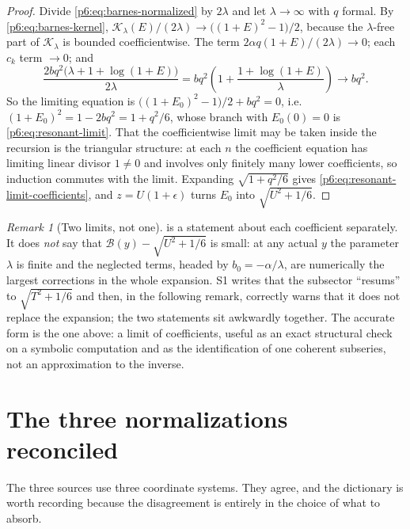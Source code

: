 \documentclass[11pt,a4paper,oneside]{book}
\theoremstyle{plain}
\theoremstyle{definition}
\theoremstyle{remark}
\newtheorem{remark}[theorem]{Remark}
\begin{document}
\begin{proof}
Divide \eqref{p6:eq:barnes-normalized} by $2\lambda$ and let
$\lambda\to\infty$ with $q$ formal.  By \eqref{p6:eq:barnes-kernel},
$\mathcal{K}_\lambda(E)/(2\lambda)\to\bigl((1+E)^{2}-1\bigr)/2$, because the
$\lambda$-free part of $\mathcal{K}_\lambda$ is bounded coefficientwise.  The
term $2\alpha q(1+E)/(2\lambda)\to0$; each $c_k$ term $\to0$; and
\[
 \frac{2bq^{2}\bigl(\lambda+1+\log(1+E)\bigr)}{2\lambda}
 =bq^{2}\left(1+\frac{1+\log(1+E)}{\lambda}\right)\longrightarrow bq^{2}.
\]
So the limiting equation is $\bigl((1+E_0)^{2}-1\bigr)/2+bq^{2}=0$, i.e.\
$(1+E_0)^{2}=1-2bq^{2}=1+q^{2}/6$, whose branch with $E_0(0)=0$ is
\eqref{p6:eq:resonant-limit}.  That the coefficientwise limit may be taken
inside the recursion is the triangular structure: at each $n$ the coefficient
equation has limiting linear divisor $1\ne0$ and involves only finitely many
lower coefficients, so induction commutes with the limit.  Expanding
$\sqrt{1+q^{2}/6}$ gives \eqref{p6:eq:resonant-limit-coefficients}, and
$z=U(1+\epsilon)$ turns $E_0$ into $\sqrt{U^{2}+1/6}$.
\end{proof}

\begin{remark}[Two limits, not one]\label{p6:rem:limit-caveat}
 is a statement about each coefficient separately.  It
does \emph{not} say that $\mathcal{B}(y)-\sqrt{U^{2}+1/6}$ is small: at any
actual $y$ the parameter $\lambda$ is finite and the neglected terms, headed
by $b_0=-\alpha/\lambda$, are numerically the largest corrections in the whole
expansion.  S1 writes that the subsector ``resums'' to $\sqrt{T^{2}+1/6}$ and
then, in the following remark, correctly warns that it does not replace the
expansion; the two statements sit awkwardly together.  The accurate form is
the one above: a limit of coefficients, useful as an exact structural check on
a symbolic computation and as the identification of one coherent subseries,
not an approximation to the inverse.
\end{remark}

\section{The three normalizations reconciled}
\label{p6:sec:dictionary}

The three sources use three coordinate systems.  They agree, and the
dictionary is worth recording because the disagreement is entirely in the
choice of what to absorb.
\end{document}
